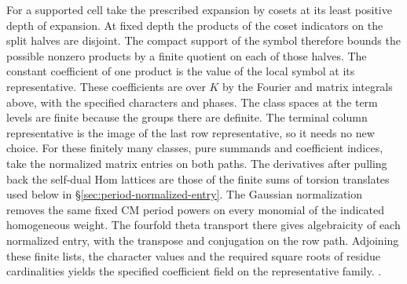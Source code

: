 For a supported cell take the prescribed expansion by
cosets at its least positive depth of expansion. At fixed
depth the products of the coset indicators on the split
halves are disjoint. The compact support of the symbol
therefore bounds the possible nonzero products by a
finite quotient on each of those halves. The constant
coefficient of one product is the value of the local
symbol at its representative. These coefficients are
over \(K\) by the Fourier and matrix integrals above,
with the specified characters and phases.
The class spaces at the term levels are finite because
the groups there are definite. The terminal column
representative is the image of the last row representative,
so it needs no new choice. For these finitely many classes,
pure summands and coefficient indices, take the normalized
matrix entries on both paths. The derivatives after pulling
back the self-dual Hom lattices are those of the finite
sums of torsion translates used below in
\S\ref{sec:period-normalized-entry}. The Gaussian
normalization removes the same fixed CM period powers
on every monomial of the indicated homogeneous weight.
The fourfold theta transport there gives algebraicity
of each normalized entry, with the transpose and
conjugation on the row path. Adjoining these finite
lists, the character values and the required square
roots of residue cardinalities yields the specified
coefficient field on the representative family.
.

